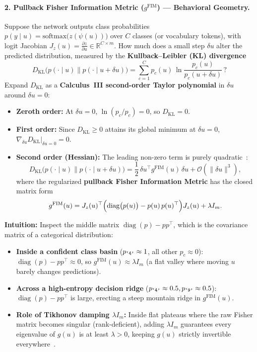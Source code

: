 \documentclass[11pt,a4paper]{article}
\newcommand{\R}{\mathbb{R}}
\newcommand{\DKL}{D_{\mathrm{KL}}}
\DeclareMathOperator{\diag}{diag}
\theoremstyle{definition}
\begin{document}
\paragraph{2. Pullback Fisher Information Metric ($g^{\mathrm{FIM}}$) --- Behavioral Geometry.}
Suppose the network outputs class probabilities $p(y \mid u) = \mathrm{softmax}\bigl(z(\psi(u))\bigr)$ over $C$ classes (or vocabulary tokens), with logit Jacobian $J_z(u) = \frac{\partial z}{\partial u} \in \R^{C \times m}$. How much does a small step $\delta u$ alter the predicted distribution, measured by the \textbf{Kullback--Leibler (KL) divergence}
\[
    \DKL\!\bigl(p(\cdot \mid u) \parallel p(\cdot \mid u + \delta u)\bigr) = \sum_{c=1}^C p_c(u)\,\ln\frac{p_c(u)}{p_c(u + \delta u)}\,?
\]
Expand $\DKL$ as a \textbf{Calculus~III second-order Taylor polynomial} in $\delta u$ around $\delta u = 0$:
\begin{itemize}[leftmargin=*]
    \item \textbf{Zeroth order:} At $\delta u = 0$, $\ln(p_c / p_c) = 0$, so $\DKL = 0$.
    \item \textbf{First order:} Since $\DKL \ge 0$ attains its global minimum at $\delta u = 0$, $\nabla_{\delta u}\DKL\big|_{\delta u = 0} = 0$.
    \item \textbf{Second order (Hessian):} The leading non-zero term is purely quadratic~\cite{amari2016infogeom}:
    \begin{equation}
        \DKL\!\bigl(p(\cdot \mid u) \parallel p(\cdot \mid u + \delta u)\bigr)
        = \frac{1}{2}\,\delta u^\top g^{\mathrm{FIM}}(u)\,\delta u + \mathcal{O}(\|\delta u\|^3),
        \label{eq:kl-taylor}
    \end{equation}
    where the regularized \textbf{pullback Fisher Information Metric} has the closed matrix form
    \begin{equation}
        g^{\mathrm{FIM}}(u) = J_z(u)^\top \Bigl(\diag\bigl(p(u)\bigr) - p(u)\,p(u)^\top\Bigr) J_z(u) + \lambda I_m.
        \label{eq:g-fim}
    \end{equation}
\end{itemize}

\noindent
\textbf{Intuition:} Inspect the middle matrix $\diag(p) - p p^\top$, which is the covariance matrix of a categorical distribution:
\begin{itemize}[leftmargin=*]
    \item \textbf{Inside a confident class basin} ($p_{\text{\texttt{`4'}}} \approx 1$, all other $p_c \approx 0$): $\diag(p) - p p^\top \approx 0$, so $g^{\mathrm{FIM}}(u) \approx \lambda I_m$ (a flat valley where moving $u$ barely changes predictions).
    \item \textbf{Across a high-entropy decision ridge} ($p_{\text{\texttt{`4'}}} \approx 0.5, p_{\text{\texttt{`9'}}} \approx 0.5$): $\diag(p) - p p^\top$ is large, erecting a steep mountain ridge in $g^{\mathrm{FIM}}(u)$.
    \item \textbf{Role of Tikhonov damping $\lambda I_m$:} Inside flat plateaus where the raw Fisher matrix becomes singular (rank-deficient), adding $\lambda I_m$ guarantees every eigenvalue of $g(u)$ is at least $\lambda > 0$, keeping $g(u)$ strictly invertible everywhere~\cite{arvanitidis2018oddity}.
\end{itemize}
\end{document}
